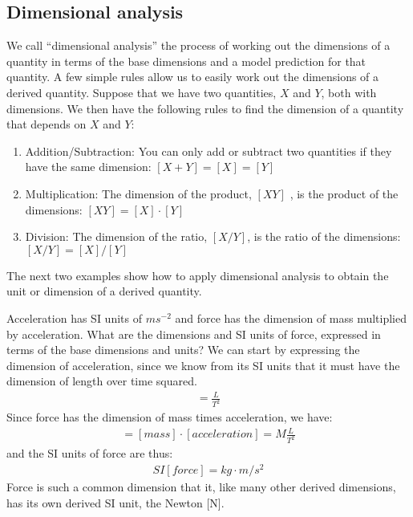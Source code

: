 \subsection{Dimensional analysis}
We call ``dimensional analysis'' the process of working out the dimensions of a quantity in terms of the base dimensions and a model prediction for that quantity. A few simple rules allow us to easily work out the dimensions of a derived quantity. Suppose that we have two quantities, $X$ and $Y$, both with dimensions. We then have the following rules to find the dimension of a quantity that depends on $X$ and $Y$:
\begin{enumerate}
\item Addition/Subtraction: You can only add or subtract two quantities if they have the same dimension: $[X+Y]=[X]=[Y]$
\item Multiplication: The dimension of the product, $[XY]$ , is the product of the dimensions: $[XY]=[X]\cdot[Y]$
\item Division: The dimension of the ratio, $[X/Y]$, is the ratio of the dimensions: $[X/Y]=[X]/[Y]$
\end{enumerate}
The next two examples show how to apply dimensional analysis to obtain the unit or dimension of a derived quantity. 
\newpage
\begin{example}{
\label{ex:modelandexperiment:forceSI} Acceleration has SI units of $\si{ms^{-2}}$ and force has the dimension of mass multiplied by acceleration. What are the dimensions and SI units of force, expressed in terms of the base dimensions and units?}
We can start by expressing the dimension of acceleration, since we know from its SI units that it must have the dimension of length over time squared.
\begin{align*}
[acceleration] = \frac{L}{T^2}
\end{align*}
Since force has the dimension of mass times acceleration, we have:
\begin{align*}
[force] = [mass]\cdot[acceleration] = M \frac{L}{T^2}
\end{align*}
and the SI units of force are thus:
\begin{align*}
SI[force] = \si{kg}\cdot\si{m/s^2}
\end{align*}
Force is such a common dimension that it, like many other derived dimensions, has its own derived SI unit, the Newton [N].
\end{example}

